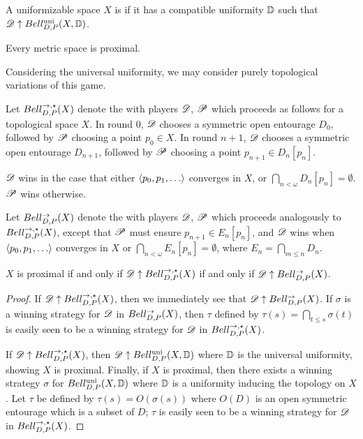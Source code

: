 \begin{defn}
  A uniformizable space $X$ is  if it has a compatible uniformity
  $\mathbb{D}$ such that $\mathscr{D}\uparrow Bell_{D,P}^{\textrm{uni}}(X,\mathbb{D})$.
\end{defn}

\begin{prop}
  Every metric space is proximal.
\end{prop}

Considering the universal uniformity, we may
consider purely topological variations of this game.

\begin{game}
  Let $Bell_{D,P}^{\to,\star}(X)$ denote the  with players $\mathscr{D}$,
  $\mathscr{P}$ which proceeds as follows for a topological space $X$. In round $0$,
  $\mathscr{D}$ chooses a symmetric open entourage $D_0$, followed by $\mathscr{P}$
  choosing a point $p_0\in X$. In round $n+1$, $\mathscr{D}$ chooses a symmetric
  open entourage $D_{n+1}$, followed
  by $\mathscr{P}$ choosing a point $p_{n+1}\in D_n[p_n]$.

  $\mathscr{D}$ wins in the case that either $\<p_0,p_1,\dots\>$ converges in $X$,
  or $\bigcap_{n<\omega}D_n[p_n] = \emptyset$. $\mathscr{P}$ wins otherwise.
\end{game}

\begin{game}
  Let $Bell_{D,P}^{\to}(X)$ denote the  with players $\mathscr{D}$,
  $\mathscr{P}$ which proceeds analogously to $Bell_{D,P}^{\to,\star}(X)$, except that
  $\mathscr{P}$ must ensure $p_{n+1}\in E_n[p_n]$,
  and $\mathscr{D}$ wins when $\<p_0,p_1,\dots\>$ converges in $X$
  or $\bigcap_{n<\omega}E_n[p_n] = \emptyset$, where
  $E_n=\bigcap_{m\leq n}D_n$.
\end{game}

\begin{thm}
  $X$ is proximal if and only if $\mathscr{D}\uparrow Bell_{D,P}^{\to,\star}(X)$ if
  and only if $\mathscr{D}\uparrow Bell_{D,P}^{\to}(X)$.
\end{thm}

\begin{proof}
  If $\mathscr{D}\uparrow Bell_{D,P}^{\to,\star}(X)$, then we immediately see that
  $\mathscr{D}\uparrow Bell_{D,P}^{\to}(X)$. If $\sigma$ is a winning strategy for $\mathscr{D}$
  in $Bell_{D,P}^{\to}(X)$, then $\tau$ defined by
  $\tau(s)=\bigcap_{t\leq s}\sigma(t)$ is easily seen to be a winning strategy
  for $\mathscr{D}$ in $Bell_{D,P}^{\to,\star}(X)$.

  If $\mathscr{D}\uparrow Bell_{D,P}^{\to,\star}(X)$, then $\mathscr{D}\uparrow Bell_{D,P}^{\textrm{uni}}(X,\mathbb{D})$
  where $\mathbb{D}$ is the universal uniformity, showing $X$ is proximal.
  Finally, if $X$ is proximal, then there exists a winning strategy $\sigma$
  for $Bell_{D,P}^{\textrm{uni}}(X,\mathbb{D})$ where $\mathbb{D}$ is a uniformity inducing the
  topology on $X$. Let $\tau$ be defined by $\tau(s)=O(\sigma(s))$ where
  $O(D)$ is an open symmetric entourage which is a subset of $D$; $\tau$
  is easily seen to be a winning strategy for $\mathscr{D}$ in $Bell_{D,P}^{\to,\star}(X)$.
\end{proof}

